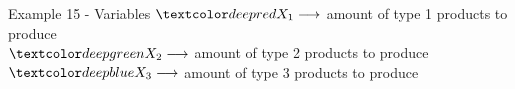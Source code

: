 \begin{frame}{Example 15 - Variables}
\Large{
$\colora{{X}_{1}} \longrightarrow$
    amount of type 1 products to produce \\ \vspace{1cm}
$\colorb{{X}_{2}} \longrightarrow$
    amount of type 2 products to produce \\ \vspace{1cm}
$\colorc{{X}_{3}} \longrightarrow$
    amount of type 3 products to produce
}
\end{frame}
